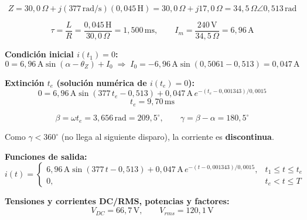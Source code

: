 \documentclass[12pt,a4paper]{article}
\begin{document}
\begin{equation}
    Z = 30{,}0\,\Omega + j(377\,\text{rad/s})(0{,}045\,\text{H}) = 30{,}0\,\Omega + j17{,}0\,\Omega
    = \boxed{34{,}5\,\Omega\angle0{,}513\,\text{rad}}
\end{equation}

\begin{equation}
    \tau = \frac{L}{R} = \frac{0{,}045\,\text{H}}{30{,}0\,\Omega} = 1{,}500\,\text{ms}, \qquad
    I_m = \frac{240\,\text{V}}{34{,}5\,\Omega} = 6{,}96\,\text{A}
\end{equation}

\textbf{Condición inicial $i(t_1)=0$:}
\begin{equation}
    0 = 6{,}96\,\text{A}\sin(\alpha-\theta_Z) + I_0 \;\Rightarrow\; I_0 = -6{,}96\,\text{A}\sin(0{,}5061-0{,}513)
    = \boxed{0{,}047\,\text{A}}
\end{equation}

\textbf{Extinción $t_e$ (solución numérica de $i(t_e)=0$):}
\begin{equation}
    0 = 6{,}96\,\text{A}\sin(377\,t_e-0{,}513) + 0{,}047\,\text{A}\,e^{-(t_e-0{,}001343)/0{,}0015}
\end{equation}
\begin{equation}
    \boxed{t_e = 9{,}70\,\text{ms}}
\end{equation}

\begin{equation}
    \beta = \omega t_e = 3{,}656\,\text{rad} = \boxed{209{,}5^\circ}, \qquad
    \gamma = \beta - \alpha = \boxed{180{,}5^\circ}
\end{equation}

Como $\gamma < 360^\circ$ (no llega al siguiente disparo), la corriente es
\textbf{discontinua}.

\textbf{Funciones de salida:}
\begin{equation}
    i(t) = \begin{cases}
        6{,}96\,\text{A}\sin(377\,t-0{,}513) + 0{,}047\,\text{A}\,e^{-(t-0{,}001343)/0{,}0015}, & t_1\leq t\leq t_e\\
        0, & t_e < t \leq T
    \end{cases}
\end{equation}

\textbf{Tensiones y corrientes DC/RMS, potencias y factores:}
\begin{equation}
    V_{DC} = \boxed{66{,}7\,\text{V}}, \qquad V_{rms} = \boxed{120{,}1\,\text{V}}
\end{equation}
\end{document}
